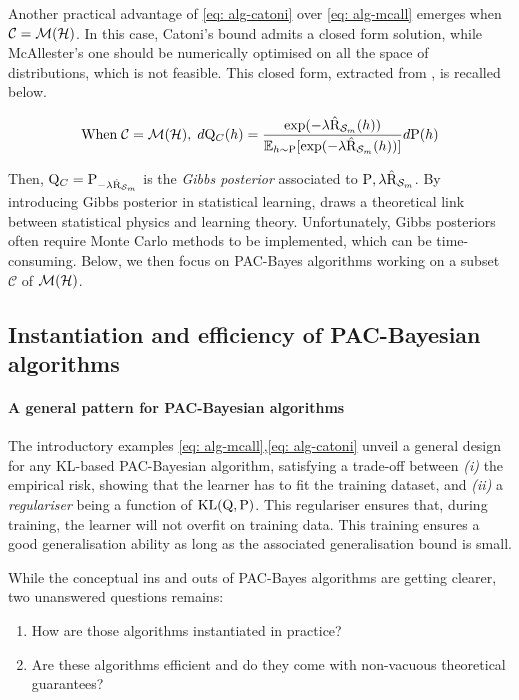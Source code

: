 Another practical advantage of \eqref{eq: alg-catoni} over \eqref{eq: alg-mcall} emerges when $\mathcal{C}= \mathcal{M}(\mathcal{H})$. In this case, Catoni's bound admits a closed form solution, while McAllester's one should be numerically optimised on all the space of distributions, which is not feasible. This closed form, extracted from \citet[Section 5.1]{catoni2003pac}, is recalled below.

\begin{align}
  \label{eq: catoni-gibbs}
  \text{When}\; \mathcal{C}= \mathcal{M}(\mathcal{H}),\; d\mathrm{Q}_{C}(h) = \frac{\exp(-\lambda \hat{\text{R}}_{\mathcal{S}_m}(h))}{\mathbb{E}_{h\sim\mathrm{P}}[\exp(-\lambda \hat{\text{R}}_{\mathcal{S}_m}(h))]} d\mathrm{P}(h)
\end{align}

Then, $\mathrm{Q}_{C} = \mathrm{P}_{-\lambda \hat{\text{R}}_{\mathcal{S}_m}}$ is the \emph{Gibbs posterior} associated to $\mathrm{P},\lambda\hat{\text{R}}_{\mathcal{S}_m}$. By introducing Gibbs posterior in statistical learning, \citet{catoni2007pac} draws a theoretical link between statistical physics and learning theory. Unfortunately, Gibbs posteriors often require Monte Carlo methods to be implemented, which can be time-consuming. Below, we then focus on PAC-Bayes algorithms working on a subset $\mathcal{C}$ of $\mathcal{M}(\mathcal{H})$. 

\subsection*{Instantiation and efficiency of PAC-Bayesian algorithms}

\paragraph{A general pattern for PAC-Bayesian algorithms}

The introductory examples \eqref{eq: alg-mcall},\eqref{eq: alg-catoni} unveil a general design for any KL-based PAC-Bayesian algorithm, satisfying a trade-off between \textit{(i)} the empirical risk, showing that the learner has to fit the training dataset, and \textit{(ii)} a \emph{regulariser} being a function of $\mathrm{KL}(\mathrm{Q},\mathrm{P})$. This regulariser ensures that, during training, the learner will not overfit on training data. This training ensures a good generalisation ability as long as the associated generalisation bound is small. 

While the conceptual ins and outs of PAC-Bayes algorithms are getting clearer, two unanswered questions remains: 

\begin{enumerate}
  \item How are those algorithms instantiated in practice?
  \item Are these algorithms efficient and do they come with non-vacuous theoretical guarantees? 
\end{enumerate}

